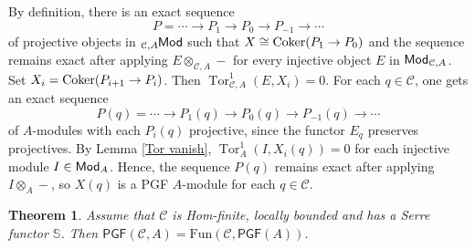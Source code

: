 \documentclass{amsart}
\theoremstyle{bfupright head,slanted body}
\theoremstyle{bfupright head,upright body}
\theoremstyle{fixed bf head,slanted body}
\newtheorem{thm}[res]{Theorem}          \newtheorem*{thm*}{Theorem}
\theoremstyle{fixed bf head,upright body}
\theoremstyle{numbered paragraph}
\newenvironment{prf*}[1][Proof]{%
	\begin{proof}[\bf #1]
		\setcounter{equation}{0}
		\renewcommand{\theequation}{\arabic{equation}}}
	{\end{proof}
}
\numberwithin{equation}{res}
\newcommand{\PGF}[1]{\mathsf{PGF}(#1)}
\newcommand{\Tor}[4][]{\operatorname{Tor}_{#2}^{#1}(#3,#4)}
\newcommand{\Coker}[1]{\nobreak{\operatorname{Coker}#1}}
\newcommand{\Fun}{\mathrm{Fun}}
\newcommand{\C}{\mathcal{C}}
\newcommand{\lMod}[1]{{}_{#1}\mspace{-1mu}{\sf{Mod}}}
\newcommand{\rMod}[1]{{\sf{Mod}}_{#1}}
\begin{document}
\begin{prf*}
By definition, there is an exact sequence
\[P=\cdots \to P_{1}\to P_{0}\to P_{-1}\to\cdots\]
of projective objects in $\lMod{\C,A}$ such that $X\cong\Coker{(P_{1}\to P_{0})}$ and the sequence remains exact after applying $E\otimes_{\C,A}-$ for every injective object $E$ in $\rMod{\C,A}$. Set $X_i=\Coker{(P_{i+1}\to P_{i})}$. Then  $\Tor[1]{\C,A}{E}{X_i}=0$. For each $q\in\C$, one gets an exact sequence
\[P(q)=\cdots \to P_{1}(q)\to P_{0}(q)\to P_{-1}(q)\to\cdots\]
of $A$-modules with each $P_{i}(q)$ projective, since the functor $E_q$ preserves projectives. By Lemma \ref{Tor vanish}, $\Tor[1]{A}{I}{X_i(q)}=0$ for each injective module $I\in\rMod{A}$. Hence, the sequence $P(q)$ remains exact after applying $I\otimes_{A}-$, so $X(q)$ is a PGF $A$-module for each $q\in\C$.
\end{prf*}

\begin{thm}\label{objectwise}
Assume that $\C$ is Hom-finite, locally bounded and has a Serre functor $\mathbb{S}$. Then $\PGF{\C,A}=\Fun(\C,\PGF{A})$.
\end{thm}
\end{document}
